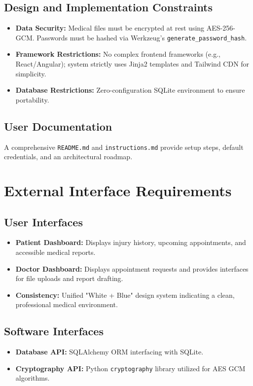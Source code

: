 \documentclass[11pt,a4paper]{article}
\begin{document}
\subsection{Design and Implementation Constraints}
\begin{itemize}
    \item \textbf{Data Security:} Medical files must be encrypted at rest using AES-256-GCM. Passwords must be hashed via Werkzeug's \texttt{generate\_password\_hash}.
    \item \textbf{Framework Restrictions:} No complex frontend frameworks (e.g., React/Angular); system strictly uses Jinja2 templates and Tailwind CDN for simplicity.
    \item \textbf{Database Restrictions:} Zero-configuration SQLite environment to ensure portability.
\end{itemize}

\subsection{User Documentation}
A comprehensive \texttt{README.md} and \texttt{instructions.md} provide setup steps, default credentials, and an architectural roadmap.

\section{External Interface Requirements}

\subsection{User Interfaces}
\begin{itemize}
    \item \textbf{Patient Dashboard:} Displays injury history, upcoming appointments, and accessible medical reports.
    \item \textbf{Doctor Dashboard:} Displays appointment requests and provides interfaces for file uploads and report drafting.
    \item \textbf{Consistency:} Unified "White + Blue" design system indicating a clean, professional medical environment.
\end{itemize}

\subsection{Software Interfaces}
\begin{itemize}
    \item \textbf{Database API:} SQLAlchemy ORM interfacing with SQLite.
    \item \textbf{Cryptography API:} Python \texttt{cryptography} library utilized for AES GCM algorithms.
\end{itemize}
\end{document}
